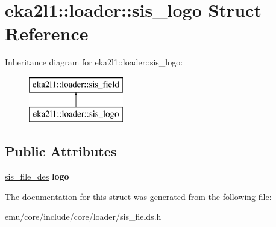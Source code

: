 \hypertarget{structeka2l1_1_1loader_1_1sis__logo}{}\section{eka2l1\+:\+:loader\+:\+:sis\+\_\+logo Struct Reference}
\label{structeka2l1_1_1loader_1_1sis__logo}
Inheritance diagram for eka2l1\+:\+:loader\+:\+:sis\+\_\+logo\+:\begin{figure}[H]
\begin{center}
\leavevmode
\includegraphics[height=2.000000cm]{structeka2l1_1_1loader_1_1sis__logo}
\end{center}
\end{figure}
\subsection*{Public Attributes}
\begin{DoxyCompactItemize}
\item 
\mbox{\label{structeka2l1_1_1loader_1_1sis__logo_aee9430fd0b5b8a456d0ca899296a79e6}} 
\mbox{\hyperlink{structeka2l1_1_1loader_1_1sis__file__des}{sis\+\_\+file\+\_\+des}} {\bfseries logo}
\end{DoxyCompactItemize}


The documentation for this struct was generated from the following file\+:\begin{DoxyCompactItemize}
\item 
emu/core/include/core/loader/sis\+\_\+fields.\+h\end{DoxyCompactItemize}
